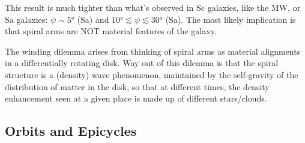 \par This result is much tighter than what's observed in Sc galaxies, like the MW, or Sa galaxies: $\psi \sim 5\text{°}$ (Sa) and $10\text{°}\lesssim \psi \lesssim 30\text{°}$ (Sa). The most likely implication is that spiral arms are NOT material features of the galaxy.
\par The winding dilemma arises from thinking of spiral arms as material alignments in a differentially rotating disk. Way out of this dilemma is that the spiral structure is a (density) wave phenomenon, maintained by the self-gravity of the distribution of matter in the disk, so that at different times, the density enhancement seen at a given place is made up of different stars/clouds.

\subsection{Orbits and Epicycles}

